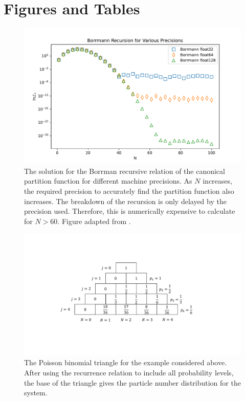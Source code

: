 \chapter{Figures and Tables}
\begin{figure}[H]
    \centering
    \includegraphics[scale=0.6]{figures/pdf/Borrmann accuracy.pdf}
    \caption{The solution for the Borrman recursive relation of the canonical partition function for different machine precisions. As $N$ increases, the required precision to accurately find the partition function also increases. The breakdown of the recursion is only delayed by the precision used. Therefore, this is numerically expensive to calculate for $N>60$. Figure adapted from \cite{Jiang}.}
    \label{fig:BorrmannAcc}
\end{figure}
\begin{figure}[H]
    \centering
    \includegraphics[scale=0.55]{figures/pdf/PBTriangle.pdf}
    \caption{The Poisson binomial triangle for the example considered above. After using the recurrence relation to include all probability levels, the base of the triangle gives the particle number distribution for the system.}
    \label{fig:Poisson Binomial Triangle}
\end{figure}
